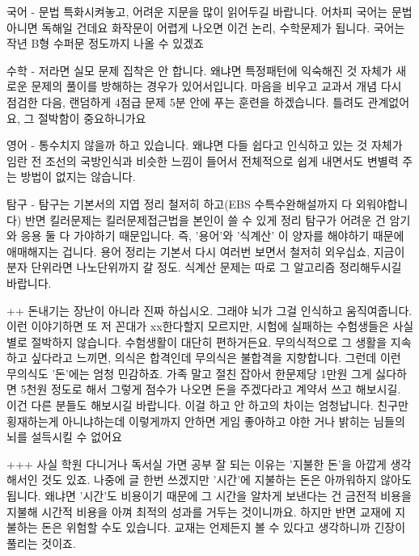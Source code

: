 국어 - 문법 특화시켜놓고, 어려운 지문을 많이 읽어두길 바랍니다. 어차피 국어는 문법 아니면 독해일 건데요
화작문이 어렵게 나오면 이건 논리, 수학문제가 됩니다. 국어는 작년 B형 수퍼문 정도까지 나올 수 있겠죠
\vspace{5mm}

수학 - 저라면 실모 문제 집착은 안 합니다. 왜냐면 특정패턴에 익숙해진 것 자체가 새로운 문제의 풀이를 방해하는 경우가 있어서입니다.
마음을 비우고 교과서 개념 다시 점검한 다음, 랜덤하게 4점급 문제 5분 안에 푸는 훈련을 하겠습니다. 틀려도 관계없어요, 그 절박함이 중요하니가요
\vspace{5mm}

영어 - 통수치지 않을까 하고 있습니다. 왜냐면 다들 쉽다고 인식하고 있는 것 자체가 임란 전 조선의 국방인식과 비슷한 느낌이 들어서
전체적으로 쉽게 내면서도 변별력 주는 방법이 없지는 않습니다.
\vspace{5mm}

탐구 - 탐구는 기본서의 지엽 정리 철저히 하고(EBS 수특수완해설까지 다 외워야합니다) 반면 킬러문제는 킬러문제접근법을 본인이 쓸 수 있게 정리
탐구가 어려운 건 암기와 응용 둘 다 가야하기 때문입니다. 즉, '용어'와 '식계산' 이 양자를 해야하기 때문에 애매해지는 겁니다.
용어 정리는 기본서 다시 여러번 보면서 철저히 외우십쇼, 지금이 분자 단위라면 나노단위까지 갈 정도.
식계산 문제는 따로 그 알고리즘 정리해두시길 바랍니다.
\vspace{5mm}

++ 돈내기는 장난이 아니라 진짜 하십시오. 그래야 뇌가 그걸 인식하고 움직여줍니다.
이런 이야기하면 또 저 꼰대가 xx한다할지 모르지만, 시험에 실패하는 수험생들은 사실 별로 절박하지 않습니다.
수험생활이 대단히 편하거든요. 무의식적으로 그 생활을 지속하고 싶다라고 느끼면, 의식은 합격인데 무의식은 불합격을 지향합니다.
그런데 이런 무의식도 '돈'에는 엄청 민감하죠.
가족 말고 절친 잡아서 한문제당 1만원 그게 싫다하면 5천원 정도로 해서 그렇게 점수가 나오면 돈을 주겠다라고 계약서 쓰고 해보시길.
이건 다른 분들도 해보시길 바랍니다. 이걸 하고 안 하고의 차이는 엄청납니다.
친구만 횡재하는게 아니냐하는데 이렇게까지 안하면 게임 좋아하고 야한 거나 밝히는 님들의 뇌를 설득시킬 수 없어요
\vspace{5mm}

+++ 사실 학원 다니거나 독서실 가면 공부 잘 되는 이유는 '지불한 돈'을 아깝게 생각해서인 것도 있죠.
나중에 글 한번 쓰겠지만 '시간'에 지불하는 돈은 아까워하지 않아도 됩니다. 왜냐면 '시간'도 비용이기 때문에
그 시간을 알차게 보낸다는 건 금전적 비용을 지불해 시간적 비용을 아껴 최적의 성과를 거두는 것이니까요.
하지만 반면 교재에 지불하는 돈은 위험할 수도 있습니다. 교재는 언제든지 볼 수 있다고 생각하니까 긴장이 풀리는 것이죠.
\vspace{5mm}






